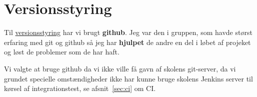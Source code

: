 \section{Versionsstyring}


Til \href{https://github.com/joachimda/I4PRJ}{versionsstyring} har vi brugt \textbf{github}. Jeg var den i gruppen, som havde størst erfaring med git og github så jeg har \textbf{hjulpet} de andre en del i løbet af projeket og løst de problemer som de har haft.

Vi valgte at bruge github da vi ikke ville få gavn af skolens git-server, da vi grundet specielle omstændigheder ikke har kunne bruge skolens Jenkins server til kørsel af integrationstest, se afsnit~\ref{sec:ci} om CI.
